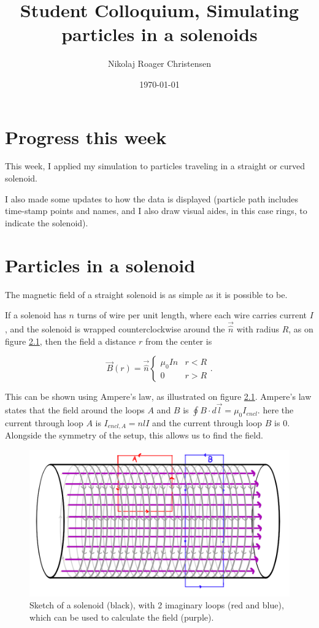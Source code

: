 \documentclass[a4paper,12pt,article]{memoir}
\title{Student Colloquium, Simulating particles in a solenoids}
\author{Nikolaj Roager Christensen}
\date{\today} %
\begin{document}
\maketitle


\tableofcontents*

\chapter{Progress this week}
This week, I applied my simulation to particles traveling in a straight or curved solenoid.

I also made some updates to how the data is displayed (particle path includes time-stamp points and names, and I also draw visual aides, in this case rings, to indicate the solenoid).

\chapter{Particles in a solenoid}
The magnetic field of a straight solenoid is as simple as it is possible to be.

If a solenoid has $n$ turns of wire per unit length, where each wire carries current $I$, and the solenoid is wrapped counterclockwise around the $\vec{\hat{n}}$ with radius $R$, as on figure \ref{fig:sol0}, then the field a distance $r$ from the center is\

\begin{equation}
\vec{B}(r)=\vec{\hat{n}}\begin{cases}\mu_0 I n & r<R\\0 &r>R \end{cases}.
\end{equation}

This can be shown using Ampere's law, as illustrated on figure \ref{fig:sol0}. Ampere's law states that the field around the loops $A$ and $B$ is $\oint B \cdot d\vec{l} = \mu_0 I_{encl}$. here the current through loop $A$ is $I_{encl,A}=n l I$ and the current through loop $B$ is $0$. Alongside the symmetry of the setup, this allows us to find the field.


\begin{figure}
\includegraphics[width=\linewidth]{solenoid.png}
\caption{Sketch of a solenoid (black), with 2 imaginary loops (red and blue), which can be used to calculate the field (purple).}
\label{fig:sol0}
\end{figure}
\end{document}
